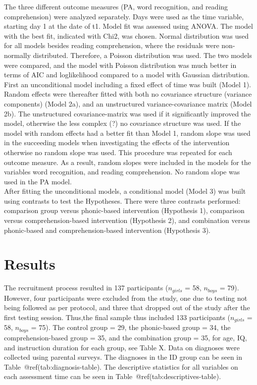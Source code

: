 \documentclass[
  ,
]{article}
\begin{document}
The three different outcome measures (PA, word recognition, and reading
comprehension) were analyzed separately. Days were used as the time
variable, starting day 1 at the date of t1. Model fit was assessed using
ANOVA. The model with the best fit, indicated with Chi2, was chosen.
Normal distribution was used for all models besides reading
comprehension, where the residuals were non-normally distributed.
Therefore, a Poisson distribution was used. The two models were
compared, and the model with Poisson distribution was much better in
terms of AIC and loglikelihood compared to a model with Gaussian
distribution. First an unconditional model including a fixed effect of
time was built (Model 1). Random effects were thereafter fitted with
both no covariance structure (variance components) (Model 2a), and an
unstructured variance-covariance matrix (Model 2b). The unstructured
covariance-matrix was used if it significantly improved the model,
otherwise the less complex (?) no covariance structure was used. If the
model with random effects had a better fit than Model 1, random slope
was used in the succeeding models when investigating the effects of the
intervention otherwise no random slope was used. This procedure was
repeated for each outcome measure. As a result, random slopes were
included in the models for the variables word recognition, and reading
comprehension. No random slope was used in the PA model.\\
After fitting the unconditional models, a conditional model (Model 3)
was built using contrasts to test the Hypotheses. There were three
contrasts performed: comparison group versus phonic-based intervention
(Hypothesis 1), comparison versus comprehension-based intervention
(Hypothesis 2), and combination versus phonic-based and
comprehension-based intervention (Hypothesis 3).

\hypertarget{results}{%
\section{Results}\label{results}}

The recruitment process resulted in 137 participants (\(n_{girls}\) =
58, \(n_{boys}\) = 79). However, four participants were excluded from
the study, one due to testing not being followed as per protocol, and
three that dropped out of the study after the first testing session.
Thus,the final sample thus included 133 participants (\(n_{girls}\) =
58, \(n_{boys}\) = 75). The control group = 29, the phonic-based group =
34, the comprehension-based group = 35, and the combination group = 35,
for age, IQ, and instruction duration for each group, see Table X. Data
on diagnoses were collected using parental surveys. The diagnoses in the
ID group can be seen in Table~@ref(tab:diagnosis-table). The descriptive
statistics for all variables on each assessment time can be seen in
Table~@ref(tab:descriptives-table).
\end{document}
